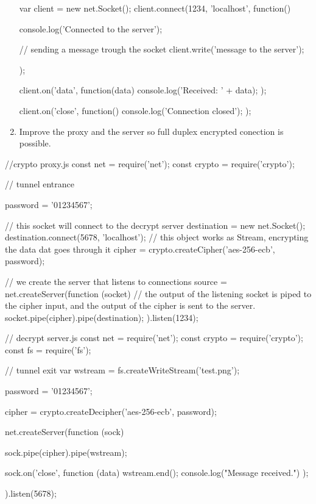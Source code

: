 \begin{Exercise}[label={proxy}]
\begin{enumerate}
\begin{js}
    var client = new net.Socket();
    client.connect(1234, 'localhost', function() {
      console.log('Connected to the server');
      
      // sending a message trough the socket
      client.write('message to the server');
    });
    
    client.on('data', function(data) {
      console.log('Received: ' + data);
    });
    
    client.on('close', function() {
      console.log('Connection closed');
    });
  \end{js}
	
	\item Improve the proxy and the server so full duplex encrypted conection is possible.
\end{enumerate}
\end{Exercise}
\begin{Answer}[ref={proxy}]
\begin{js}
//crypto proxy.js
const net = require('net');
const crypto = require('crypto');

// tunnel entrance

password = '01234567';

// this socket will connect to the decrypt server
destination = new net.Socket();
destination.connect(5678, 'localhost');
// this object works as Stream, encrypting the data dat goes through it
cipher = crypto.createCipher('aes-256-ecb', password);

// we create the server that listens to connections
source = net.createServer(function (socket) {
    // the output of the listening socket is piped to the cipher input, and the output of the cipher is sent to the server.
    socket.pipe(cipher).pipe(destination);
}).listen(1234);
\end{js}


\begin{js}
// decrypt server.js
const net = require('net');
const crypto = require('crypto');
const fs = require('fs');

// tunnel exit
var wstream = fs.createWriteStream('test.png');

password = '01234567';

cipher = crypto.createDecipher('aes-256-ecb', password);

net.createServer(function (sock) {
    sock.pipe(cipher).pipe(wstream);

    sock.on('close', function (data) {
        wstream.end();
        console.log("Message received.")
    });
}).listen(5678);
\end{js}
\end{Answer}